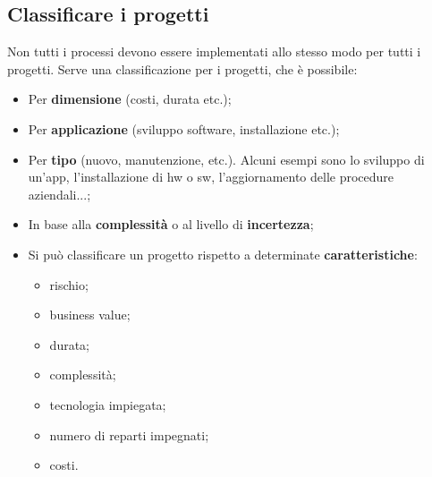 \subsection{Classificare i progetti}
Non tutti i processi devono essere implementati allo stesso modo per tutti i progetti. Serve una classificazione per i progetti, che è possibile:
\begin{itemize}
	\item Per \textbf{dimensione} (costi, durata etc.);
	\item Per \textbf{applicazione} (sviluppo software, installazione etc.);
	\item Per \textbf{tipo} (nuovo, manutenzione, etc.). Alcuni esempi sono lo sviluppo di un'app, l'installazione di hw o sw, l'aggiornamento delle procedure aziendali...;
	\item In base alla \textbf{complessità} o al livello di \textbf{incertezza};
	\item Si può classificare un progetto rispetto a determinate \textbf{caratteristiche}:
	\begin{itemize}
		\item rischio;
		\item business value;
		\item durata;
		\item complessità;
		\item tecnologia impiegata;
		\item numero di reparti impegnati;
		\item costi.
	\end{itemize}
\end{itemize}
